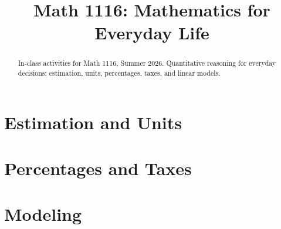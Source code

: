 \documentclass{xourse}
\title{Math 1116: Mathematics for Everyday Life}
\author{}
\begin{document}
\begin{abstract}
    In-class activities for Math 1116, Summer 2026. Quantitative reasoning for
    everyday decisions: estimation, units, percentages, taxes, and linear models.
\end{abstract}
\maketitle

\part{Estimation and Units}


\part{Percentages and Taxes}


\part{Modeling}

\end{document}
